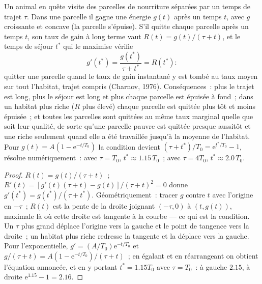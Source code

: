 \begin{theorem}\label{thm:b3:behavioural-ecology:mvt}
Un animal en quête visite des parcelles de nourriture séparées par un
temps de trajet $\tau$. Dans une parcelle il gagne une énergie $g(t)$
après un temps $t$, avec $g$ croissante et concave (la parcelle
s'épuise). S'il quitte chaque parcelle après un temps $t$, son taux de
gain à long terme vaut $R(t) = g(t)/(\tau + t)$, et le temps de séjour
$t^{*}$ qui le maximise vérifie
\[
g'(t^{*}) = \frac{g(t^{*})}{\tau + t^{*}} = R(t^{*}) :
\]
quitter une parcelle quand le taux de gain instantané y est tombé au
taux moyen sur tout l'habitat, trajet compris (Charnov, 1976).
Conséquences~: plus le trajet est long, plus le séjour est long et plus
chaque parcelle est épuisée à fond~; dans un habitat plus riche ($R$
plus élevé) chaque parcelle est quittée plus tôt et moins épuisée~; et
toutes les parcelles sont quittées au même taux marginal quelle que soit
leur qualité, de sorte qu'une parcelle pauvre est quittée presque
aussitôt et une riche seulement quand elle a été travaillée jusqu'à la
moyenne de l'habitat. Pour $g(t) = A(1 -
\mathrm{e}^{-t/T_{0}})$ la condition devient $(\tau + t^{*})/T_{0} =
\mathrm{e}^{t^{*}/T_{0}} - 1$, résolue numériquement~: avec $\tau = T_{0}$,
$t^{*} \approx 1.15\,T_{0}$~; avec $\tau = 4T_{0}$, $t^{*} \approx
2.0\,T_{0}$.
\end{theorem}
\begin{proof}
$R(t) = g(t)/(\tau + t)$~; $R'(t) = [g'(t)(\tau + t) - g(t)]/(\tau +
t)^{2} = 0$ donne $g'(t^{*}) = g(t^{*})/(\tau + t^{*})$.
Géométriquement~: tracer $g$ contre $t$ avec l'origine en $-\tau$~;
$R(t)$ est la pente de la droite joignant $(-\tau, 0)$ à $(t, g(t))$,
maximale là où cette droite est tangente à la courbe --- ce qui est la
condition. Un $\tau$ plus grand déplace l'origine vers la gauche et le
point de tangence vers la droite~; un habitat plus riche redresse la
tangente et la déplace vers la gauche. Pour l'exponentielle,
$g' = (A/T_{0})
\mathrm{e}^{-t/T_{0}}$ et $g/(\tau + t) = A(1 - \mathrm{e}^{-t/T_{0}})/
(\tau + t)$~; en égalant et en réarrangeant on obtient l'équation
annoncée, et en y portant $t^{*} = 1.15T_{0}$ avec $\tau = T_{0}$~: à
gauche $2.15$, à droite $\mathrm{e}^{1.15} - 1 = 2.16$.
\end{proof}

